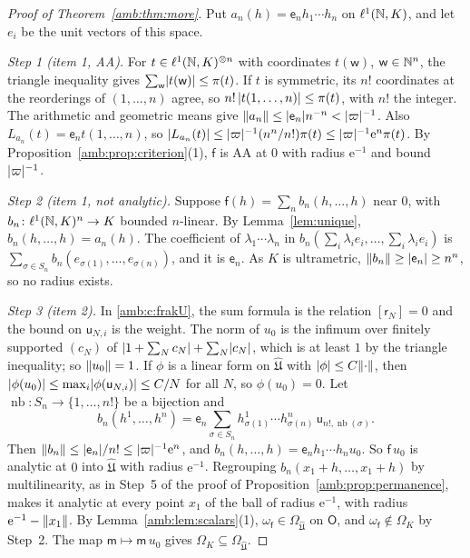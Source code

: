 \begin{proof}[Proof of Theorem~\ref{amb:thm:more}]
Put $a_n(h)=\mathsf e_nh_1\cdots h_n$ on $\ell^1(\mathbb N,K)$, and let $e_i$ be the unit vectors of this space.

\emph{Step 1 (item 1, AA).} For $t\in\ell^1(\mathbb N,K)^{\otimes n}$ with coordinates $t(\mathsf w)$, $\mathsf w\in\mathbb N^n$, the triangle inequality gives $\sum_{\mathsf w}\lvert t(\mathsf w)\rvert\le\pi(t)$. If $t$ is symmetric, its $n!$ coordinates at the reorderings of $(1,\dots,n)$ agree, so $n!\,\lvert t(1,\dots,n)\rvert\le\pi(t)$, with $n!$ the integer. The arithmetic and geometric means give $\lVert a_n\rVert\le\lvert \mathsf e_n\rvert n^{-n}<\lvert \varpi\rvert^{-1}$. Also $L_{a_n}(t)=\mathsf e_nt(1,\dots,n)$, so $\lvert L_{a_n}(t)\rvert\le\lvert \varpi\rvert^{-1}(n^n/n!)\pi(t)\le\lvert \varpi\rvert^{-1}\mathrm e^n\pi(t)$. By Proposition~\ref{amb:prop:criterion}(1), $\mathsf f$ is AA at $0$ with radius $\mathrm e^{-1}$ and bound $\lvert \varpi\rvert^{-1}$.

\emph{Step 2 (item 1, not analytic).} Suppose $\mathsf f(h)=\sum_nb_n(h,\dots,h)$ near $0$, with $b_n\colon\ell^1(\mathbb N,K)^n\to K$ bounded $n$-linear. By Lemma~\ref{lem:unique}, $b_n(h,\dots,h)=a_n(h)$. The coefficient of $\lambda_1\cdots\lambda_n$ in $b_n(\sum_i\lambda_ie_i,\dots,\sum_i\lambda_ie_i)$ is $\sum_{\sigma\in S_n}b_n(e_{\sigma(1)},\dots,e_{\sigma(n)})$, and it is $\mathsf e_n$. As $K$ is ultrametric, $\lVert b_n\rVert\ge\lvert \mathsf e_n\rvert\ge n^n$, so no radius exists.

\emph{Step 3 (item 2).} In \eqref{amb:c:frakU}, the sum formula is the relation $[\mathsf r_N]=0$ and the bound on $\mathsf u_{N,i}$ is the weight. The norm of $u_0$ is the infimum over finitely supported $(c_N)$ of $\lvert 1+\sum_Nc_N\rvert+\sum_N\lvert c_N\rvert$, which is at least $1$ by the triangle inequality; so $\lVert u_0\rVert=1$. If $\phi$ is a linear form on $\widehat{\mathfrak U}$ with $\lvert \phi\rvert\le C\lVert \cdot\rVert$, then $\lvert \phi(u_0)\rvert\le\max_i\lvert \phi(\mathsf u_{N,i})\rvert\le C/N$ for all $N$, so $\phi(u_0)=0$. Let $\operatorname{nb}\colon S_n\to\{1,\dots,n!\}$ be a bijection and
\[
 b_n(h^1,\dots,h^n)=\mathsf e_n\sum_{\sigma\in S_n}h^1_{\sigma(1)}\cdots h^n_{\sigma(n)}\,\mathsf u_{n!,\operatorname{nb}(\sigma)} .
\]
Then $\lVert b_n\rVert\le\lvert \mathsf e_n\rvert/n!\le\lvert \varpi\rvert^{-1}\mathrm e^n$, and $b_n(h,\dots,h)=\mathsf e_nh_1\cdots h_nu_0$. So $\mathsf f\,u_0$ is analytic at $0$ into $\widehat{\mathfrak U}$ with radius $\mathrm e^{-1}$. Regrouping $b_n(x_1+h,\dots,x_1+h)$ by multilinearity, as in Step~5 of the proof of Proposition~\ref{amb:prop:permanence}, makes it analytic at every point $x_1$ of the ball of radius $\mathrm e^{-1}$, with radius $\mathrm e^{-1}-\lVert x_1\rVert$. By Lemma~\ref{amb:lem:scalars}(1), $\omega_{\mathsf f}\in\Omega_{\widehat{\mathfrak U}}$ on $\mathsf O$, and $\omega_{\mathsf f}\notin\Omega_K$ by Step~2. The map $\mathsf m\mapsto\mathsf m\,u_0$ gives $\Omega_K\subseteq\Omega_{\widehat{\mathfrak U}}$.


\end{proof}
